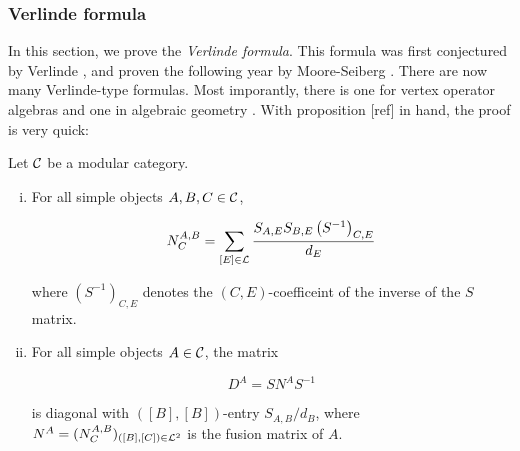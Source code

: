 \subsubsection{Verlinde formula}

In this section, we prove the {\em Verlinde formula}. This formula was first conjectured by Verlinde \cite{verlinde1988fusion}, and proven the following year by Moore-Seiberg \cite{moore1989classical}. There are now many Verlinde-type formulas. Most imporantly, there is one for vertex operator algebras \cite{huang2008vertex} and one in algebraic geometry \cite{faltings1994proof}. With proposition [ref] in hand, the proof is very quick:

\begin{thrm} Let ${\mathcal C}$ be a modular category.

\begin{enumerate}[(i)]
\item For all simple objects $A,B,C\in {\mathcal C}$,

$$N^{A,B}_C=\sum_{[E]\in {\mathcal L}}\frac{S_{A,E}S_{B,E}\left(S^{-1}\right)_{C,E}}{d_E}$$

where $(S^{-1})_{C,E}$ denotes the $(C,E)$-coefficeint of the inverse of the $S$ matrix.

\item For all simple objects $A\in {\mathcal C}$, the matrix

$$D^A=S N^{A}S^{-1}$$

is diagonal with $([B],[B])$-entry $S_{A,B}/d_B$, where $N^{A}=(N^{A,B}_C)_{([B],[C])\in {\mathcal L}^2}$ is the fusion matrix of $A$.
\end{enumerate}
\end{thrm}
